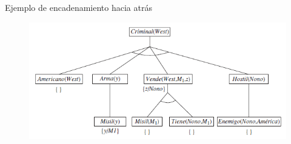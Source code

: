     \begin{frame}{Ejemplo de encadenamiento hacia atrás}
        \begin{figure}\includegraphics[width =120mm]{38img-cap9.PNG}\end{figure}
    \end{frame}
